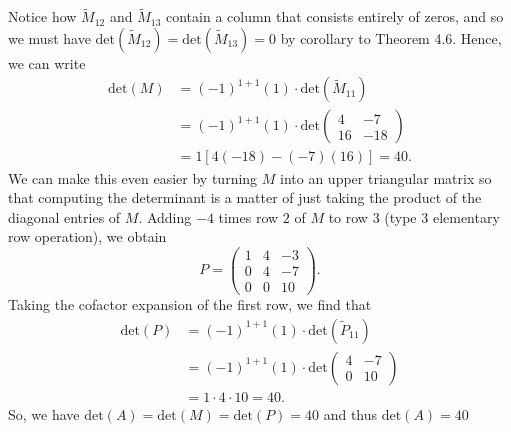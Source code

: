 Notice how \( {\tilde{M}}_{12} \) and \( {\tilde{M}}_{13} \) contain a column that consists entirely of zeros, and so we must have \( \text{det}({\tilde{M}}_{12}) = \text{det}({\tilde{M}}_{13}) = 0  \) by corollary to Theorem 4.6. Hence, we can write
\begin{align*}
    \text{det}(M) &= (-1)^{1+1} (1) \cdot \text{det}({\tilde{M}}_{11}) \\
                  &=  (-1)^{1+1} (1) \cdot \text{det} \begin{pmatrix} 
                      4 & -7 \\
                      16 & -18
                            \end{pmatrix} \\
                  &= 1 [ 4(-18) - (-7)(16)] = 40.
\end{align*}
We can make this even easier by turning \( M  \) into an upper triangular matrix so that computing the determinant is a matter of just taking the product of the diagonal entries of \( M  \). Adding \( -4  \) times row \( 2  \) of \( M  \) to row \( 3  \) (type 3 elementary row operation), we obtain 
\[  P = \begin{pmatrix} 
    1 & 4 & -3 \\
    0 & 4 & -7 \\
    0 & 0 & 10
          \end{pmatrix}. \]
Taking the cofactor expansion of the first row, we find that
\begin{align*}
    \text{det}(P) &= (-1)^{1+1} (1) \cdot \text{det}({\tilde{P}}_{11}) \\
                  &= (-1)^{1+1} (1) \cdot \text{det} \begin{pmatrix} 
                      4 & - 7 \\
                      0 & 10
                            \end{pmatrix}  \\
                        &= 1 \cdot 4 \cdot 10 = 40.
\end{align*}
So, we have \( \text{det}(A) = \text{det}(M) = \text{det}(P) = 40  \) and thus \( \text{det}(A) = 40 \)

